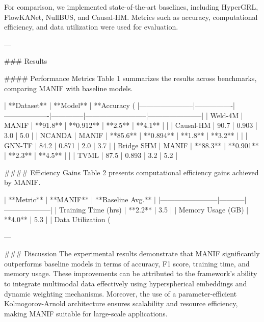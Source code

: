 For comparison, we implemented state-of-the-art baselines, including HyperGRL, FlowKANet, NullBUS, and Causal-HM. Metrics such as accuracy, computational efficiency, and data utilization were used for evaluation.

---

### Results

#### Performance Metrics
Table 1 summarizes the results across benchmarks, comparing MANIF with baseline models.

| **Dataset**          | **Model**      | **Accuracy (%
|-----------------------|----------------|-------------------|--------------|--------------------------|-----------------------|
| Weld-4M              | MANIF          | **91.8**         | **0.912**    | **2.5**                 | **4.1**               |
|                       | Causal-HM      | 90.7             | 0.903        | 3.0                     | 5.0                   |
| NCANDA               | MANIF          | **85.6**         | **0.894**    | **1.8**                 | **3.2**               |
|                       | GNN-TF         | 84.2             | 0.871        | 2.0                     | 3.7                   |
| Bridge SHM           | MANIF          | **88.3**         | **0.901**    | **2.3**                 | **4.5**               |
|                       | TVML           | 87.5             | 0.893        | 3.2                     | 5.2                   |

#### Efficiency Gains
Table 2 presents computational efficiency gains achieved by MANIF.

| **Metric**            | **MANIF** | **Baseline Avg.** |
|------------------------|-----------|--------------------|
| Training Time (hrs)    | **2.2**   | 3.5                |
| Memory Usage (GB)      | **4.0**   | 5.3                |
| Data Utilization (%

---

### Discussion
The experimental results demonstrate that MANIF significantly outperforms baseline models in terms of accuracy, F1 score, training time, and memory usage. These improvements can be attributed to the framework's ability to integrate multimodal data effectively using hyperspherical embeddings and dynamic weighting mechanisms. Moreover, the use of a parameter-efficient Kolmogorov-Arnold architecture ensures scalability and resource efficiency, making MANIF suitable for large-scale applications.

